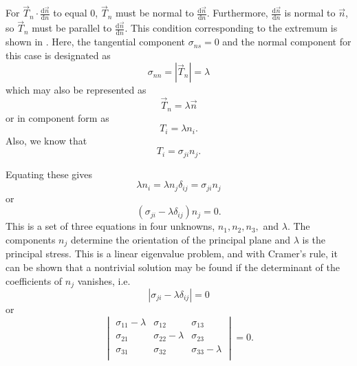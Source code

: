 For $\Vec{T}_n \cdot \frac{\mathrm{d}\Vec{n}}{\mathrm{d}n}$ to equal 0, $\Vec{T}_n$ must be normal to $\frac{\mathrm{d}\Vec{n}}{\mathrm{d}n}$.
Furthermore, $\frac{\mathrm{d}\Vec{n}}{\mathrm{d}n} $ is normal to $\Vec{n}$, so $\Vec{T}_n$ must be parallel to $\frac{\mathrm{d}\Vec{n}}{\mathrm{d}n}$.
This condition corresponding to the extremum is shown in .
Here, the tangential component $\sigma_{ns} = 0$ and the normal component for this case is designated as
\begin{equation*}
  \sigma_{nn} = \left| \Vec{T}_n \right| = \lambda
\end{equation*}
which may also be represented as
\begin{equation*}
  \Vec{T}_n = \lambda \Vec{n}
\end{equation*}
or in component form as
\begin{equation*}
  T_i = \lambda n_i
.\end{equation*}
Also, we know that
\begin{equation*}
  T_i = \sigma_{ji} n_j
.\end{equation*}

Equating these gives
\begin{equation*}
  \lambda n_i = \lambda n_j \delta_{ij} = \sigma_{ji} n_j
\end{equation*}
or
\begin{equation} \label{eq:prinor}
  \left( \sigma_{ji} - \lambda \delta_{ij} \right) n_j = 0
.\end{equation}
This is a set of three equations in four unknowns, $n_1, n_2, n_3,$ and $\lambda$.
The components $n_j$ determine the orientation of the principal plane and $\lambda$ is the principal stress.
This is a linear eigenvalue problem, and with Cramer's rule, it can be shown that a nontrivial solution may be found if the determinant of the coefficients of $n_j$ vanishes, i.e.
\begin{equation*}
  \left| \sigma_{ji} - \lambda \delta_{ij} \right| = 0
\end{equation*}
or
\begin{equation*}
  \begin{vmatrix}
    \sigma_{11}-\lambda & \sigma_{12} & \sigma_{13}\\
  \sigma_{21} & \sigma_{22}-\lambda & \sigma_{23}\\
  \sigma_{31} & \sigma_{32} & \sigma_{33}-\lambda\\
  \end{vmatrix} = 0
.\end{equation*}

